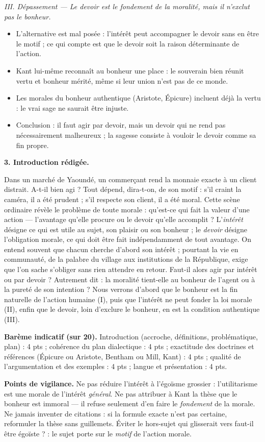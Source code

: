 \documentclass[11pt]{article}
\begin{document}
\begin{corrige}
\emph{III. Dépassement — Le devoir est le fondement de la moralité, mais il n'exclut pas le bonheur.}
\begin{itemize}
\item L'alternative est mal posée : l'intérêt peut accompagner le devoir sans en être le motif ; ce qui compte est que le devoir soit la raison déterminante de l'action.
\item Kant lui-même reconnaît au bonheur une place : le souverain bien réunit vertu et bonheur mérité, même si leur union n'est pas de ce monde.
\item Les morales du bonheur authentique (Aristote, Épicure) incluent déjà la vertu : le vrai sage ne saurait être injuste.
\item Conclusion : il faut agir par devoir, mais un devoir qui ne rend pas nécessairement malheureux ; la sagesse consiste à vouloir le devoir comme sa fin propre.
\end{itemize}

\textbf{3. Introduction rédigée.}

Dans un marché de Yaoundé, un commerçant rend la monnaie exacte à un client distrait. A-t-il bien agi ? Tout dépend, dira-t-on, de son motif : s'il craint la caméra, il a été prudent ; s'il respecte son client, il a été moral. Cette scène ordinaire révèle le problème de toute morale : qu'est-ce qui fait la valeur d'une action — l'avantage qu'elle procure ou le devoir qu'elle accomplit ? L'\emph{intérêt} désigne ce qui est utile au sujet, son plaisir ou son bonheur ; le \emph{devoir} désigne l'obligation morale, ce qui doit être fait indépendamment de tout avantage. On entend souvent que chacun cherche d'abord son intérêt ; pourtant la vie en communauté, de la palabre du village aux institutions de la République, exige que l'on sache s'obliger sans rien attendre en retour. Faut-il alors agir par intérêt ou par devoir ? Autrement dit : la moralité tient-elle au bonheur de l'agent ou à la pureté de son intention ? Nous verrons d'abord que le bonheur est la fin naturelle de l'action humaine (I), puis que l'intérêt ne peut fonder la loi morale (II), enfin que le devoir, loin d'exclure le bonheur, en est la condition authentique (III).

\textbf{Barème indicatif (sur 20).} Introduction (accroche, définitions, problématique, plan) : 4 pts ; cohérence du plan dialectique : 4 pts ; exactitude des doctrines et références (Épicure ou Aristote, Bentham ou Mill, Kant) : 4 pts ; qualité de l'argumentation et des exemples : 4 pts ; langue et présentation : 4 pts.

\textbf{Points de vigilance.} Ne pas réduire l'intérêt à l'égoïsme grossier : l'utilitarisme est une morale de l'intérêt \emph{général}. Ne pas attribuer à Kant la thèse que le bonheur est immoral — il refuse seulement d'en faire le \emph{fondement} de la morale. Ne jamais inventer de citations : si la formule exacte n'est pas certaine, reformuler la thèse sans guillemets. Éviter le hors-sujet qui glisserait vers \guillemotleft faut-il être égoïste ? \guillemotright : le sujet porte sur le \emph{motif} de l'action morale.
\end{corrige}
\end{document}
